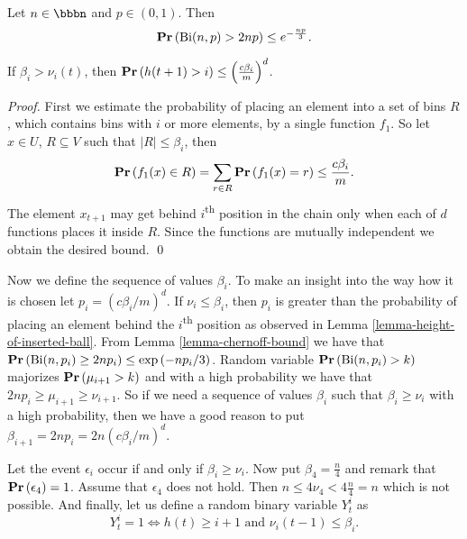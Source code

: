 \begin{lemma}
\label{lemma-chernoff-bound}
Let $n \in \bbbn$ and $p \in (0, 1)$. Then $$\mathbf{Pr}\left(\mathrm{Bi}(n, p) > 2np\right) \leq e ^ {- \frac{np}{3}} \textit{.}$$
\end{lemma}

\begin{lemma}
\label{lemma-height-of-inserted-ball}
If $\beta_i > \nu_i(t)$, then $\mathbf{Pr}\left(h(t + 1) > i\right) \leq \left(\frac{c\beta_i}{m}\right) ^ d$.
\end{lemma}
\begin{proof}
First we estimate the probability of placing an element into a set of bins $R$, which contains bins with $i$ or more elements, by a single function $f_1$. So let $x \in U$, $R \subseteq V$ such that $|R| \leq \beta_i$, then $$\mathbf{Pr}\left(f_1(x) \in R\right) = \displaystyle\sum_{r \in R} \mathbf{Pr}\left(f_1(x) = r\right) \leq \frac{c\beta_i}{m}.$$
The element $x_{t + 1}$ may get behind $i$\textsuperscript{th} position in the chain only when each of $d$ functions places it inside $R$. Since the functions are mutually independent we obtain the desired bound.
\qed
\end{proof}

Now we define the sequence of values $\beta_i$. To make an insight into the way how it is chosen let $p_i = \left({c\beta_i}/{m}\right) ^ d$. If $\nu_i \leq \beta_i$, then $p_i$ is greater than the probability of placing an element behind the $i$\textsuperscript{th} position as observed in Lemma \ref{lemma-height-of-inserted-ball}. From Lemma \ref{lemma-chernoff-bound} we have that $\mathbf{Pr}\left(\mathrm{Bi}(n, p_i) \geq 2np_i\right) \leq \exp\left({-np_i}/{3}\right)$. Random variable $\mathbf{Pr}\left(\mathrm{Bi}(n, p_i) > k\right)$ majorizes $\mathbf{Pr}\left(\mu_{i + 1} > k\right)$ and with a high probability we have that $2np_i \geq \mu_{i + 1} \geq \nu_{i + 1}$. So if we need a sequence of values $\beta_i$ such that $\beta_i \geq \nu_{i}$ with a high probability, then we have a good reason to put $\beta_{i + 1} = 2np_i = 2n\left({c\beta_i}/{m}\right) ^ d$.

Let the event $\epsilon_i$ occur if and only if $\beta_i \geq \nu_i$. Now put $\beta_4 = \frac{n}{4}$ and remark that $\mathbf{Pr}\left(\epsilon_4\right) = 1$. Assume that $\epsilon_4$ does not hold. Then $n \leq 4 \nu_4 < 4 \frac{n}{4} = n$ which is not possible. And finally, let us define a random binary variable $Y_t^i$ as $$Y_t^i = 1 \Leftrightarrow h(t) \geq i + 1 \mbox{ and } \nu_i(t - 1) \leq \beta_i \textit{.}$$

